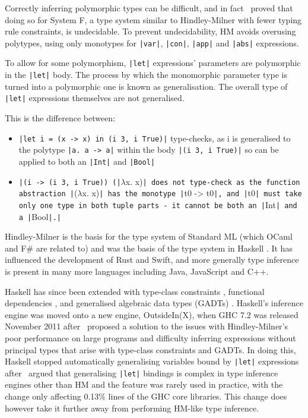 \documentclass[a4paper,fleqn,12pt]{article}
\begin{document}
Correctly inferring polymorphic types can be difficult, and in fact~\cite{ref14} proved that doing so for System F, a type system similar to Hindley-Milner with fewer typing rule constraints, is undecidable. To prevent undecidability, HM avoids overusing polytypes, using only monotypes for \texttt{|var|}, \texttt{|con|}, \texttt{|app|} and \texttt{|abs|} expressions.

To allow for some polymorphism, \texttt{|let|} expressions’ parameters are polymorphic in the \texttt{|let|} body. The process by which the monomorphic parameter type is turned into a polymorphic one is known as generalisation. The overall type of \texttt{|let|} expressions themselves are not generalised.

This is the difference between:
\begin{itemize}
  \item \texttt{|let i = (\lambda x -> x) in (i 3, i True)|} type-checks, as i is generalised to the polytype \texttt{|\forall a. a -> a|} within the body \texttt{|(i 3, i True)|} so can be applied to both an \texttt{|Int|} and \texttt{|Bool|}
  \item \texttt{|(\lambda i -> (i 3, i True)) (|}$\lambda$x. x)\texttt{| does not type-check as the function abstraction |}($\lambda$x. x)\texttt{| has the monotype |}t0 -> t0\texttt{|, and |}t0\texttt{| must take only one type in both tuple parts - it cannot be both an |}Int\texttt{| and a |}Bool\texttt{|.|}
\end{itemize}

Hindley-Milner is the basis for the type system of Standard ML \citep{ref15} (which OCaml and F\# are related to) and was the basis of the type system in Haskell \citep{ref16}. It has influenced the development of Rust and Swift, and more generally type inference is present in many more languages including Java, JavaScript and C++.

Haskell has since been extended with type-class constraints \citep{ref17}, functional dependencies \citep{ref18}, and generalised algebraic data types (GADTs) \citep{ref19}. Haskell’s inference engine was moved onto a new engine, OutsideIn(X), when GHC 7.2 was released November 2011 after~\cite{ref20} proposed a solution to the issues with Hindley-Milner’s poor performance on large programs and difficulty inferring expressions without principal types that arise with type-class constraints and GADTs. In doing this, Haskell stopped automatically generalising variables bound by \texttt{|let|} expressions after~\cite{ref21} argued that generalising \texttt{|let|} bindings is complex in type inference engines other than HM and the feature was rarely used in practice, with the change only affecting 0.13\% lines of the GHC core libraries. This change does however take it further away from performing HM-like type inference.
\end{document}
